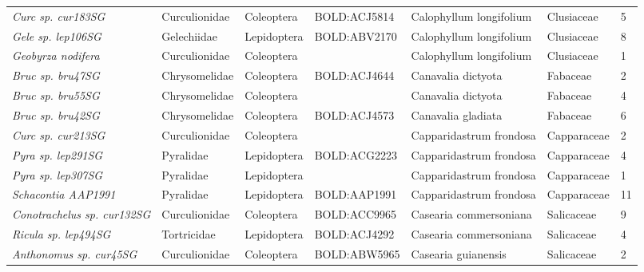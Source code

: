 \documentclass[11pt]{article}
\begin{document}
\begin{landscape}
\begin{longtable}{@{}lllllll@{}}
\textit{Curc sp. cur183SG}                            & Curculionidae   & Coleoptera   & BOLD:ACJ5814 & Calophyllum longifolium            & Clusiaceae       & 5     \\
\textit{Gele sp. lep106SG}                            & Gelechiidae     & Lepidoptera  & BOLD:ABV2170 & Calophyllum longifolium            & Clusiaceae       & 8     \\
\textit{Geobyrza nodifera}                            & Curculionidae   & Coleoptera   &              & Calophyllum longifolium            & Clusiaceae       & 1     \\
\textit{Bruc sp. bru47SG}                             & Chrysomelidae   & Coleoptera   & BOLD:ACJ4644 & Canavalia dictyota                 & Fabaceae         & 2     \\
\textit{Bruc sp. bru55SG}                             & Chrysomelidae   & Coleoptera   &              & Canavalia dictyota                 & Fabaceae         & 4     \\
\textit{Bruc sp. bru42SG}                             & Chrysomelidae   & Coleoptera   & BOLD:ACJ4573 & Canavalia gladiata                 & Fabaceae         & 6     \\
\textit{Curc sp. cur213SG}                            & Curculionidae   & Coleoptera   &              & Capparidastrum frondosa            & Capparaceae      & 2     \\
\textit{Pyra sp. lep291SG}                            & Pyralidae       & Lepidoptera  & BOLD:ACG2223 & Capparidastrum frondosa            & Capparaceae      & 4     \\
\textit{Pyra sp. lep307SG}                            & Pyralidae       & Lepidoptera  &              & Capparidastrum frondosa            & Capparaceae      & 1     \\
\textit{Schacontia AAP1991}                           & Pyralidae       & Lepidoptera  & BOLD:AAP1991 & Capparidastrum frondosa            & Capparaceae      & 11    \\
\textit{Conotrachelus sp. cur132SG}                   & Curculionidae   & Coleoptera   & BOLD:ACC9965 & Casearia commersoniana             & Salicaceae       & 9     \\
\textit{Ricula sp. lep494SG}                          & Tortricidae     & Lepidoptera  & BOLD:ACJ4292 & Casearia commersoniana             & Salicaceae       & 4     \\
\textit{Anthonomus sp. cur45SG}                       & Curculionidae   & Coleoptera   & BOLD:ABW5965 & Casearia guianensis                & Salicaceae       & 2     \\

\end{longtable}
\end{landscape}
\end{document}
